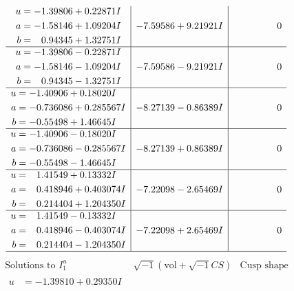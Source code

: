 \documentclass[1p]{elsarticle_modified}
\theoremstyle{definition}
\newcommand{\I}{\sqrt{-1}}
\begin{document}
$$\begin{array}{c|c|c}
\begin{aligned}
u &= -1.39806 + 0.22871 I \\
a &= -1.58146 + 1.09204 I \\
b &= \phantom{-}0.94345 + 1.32751 I\end{aligned}
 & -7.59586 + 9.21921 I & \phantom{-0.000000 } 0 \\ \hline\begin{aligned}
u &= -1.39806 - 0.22871 I \\
a &= -1.58146 - 1.09204 I \\
b &= \phantom{-}0.94345 - 1.32751 I\end{aligned}
 & -7.59586 - 9.21921 I & \phantom{-0.000000 } 0 \\ \hline\begin{aligned}
u &= -1.40906 + 0.18020 I \\
a &= -0.736086 + 0.285567 I \\
b &= -0.55498 + 1.46645 I\end{aligned}
 & -8.27139 - 0.86389 I & \phantom{-0.000000 } 0 \\ \hline\begin{aligned}
u &= -1.40906 - 0.18020 I \\
a &= -0.736086 - 0.285567 I \\
b &= -0.55498 - 1.46645 I\end{aligned}
 & -8.27139 + 0.86389 I & \phantom{-0.000000 } 0 \\ \hline\begin{aligned}
u &= \phantom{-}1.41549 + 0.13332 I \\
a &= \phantom{-}0.418946 + 0.403074 I \\
b &= \phantom{-}0.214404 + 1.204350 I\end{aligned}
 & -7.22098 - 2.65469 I & \phantom{-0.000000 } 0 \\ \hline\begin{aligned}
u &= \phantom{-}1.41549 - 0.13332 I \\
a &= \phantom{-}0.418946 - 0.403074 I \\
b &= \phantom{-}0.214404 - 1.204350 I\end{aligned}
 & -7.22098 + 2.65469 I & \phantom{-0.000000 } 0\\
 \hline 
 \end{array}$$\newpage$$\begin{array}{c|c|c}  
\text{Solutions to }I^u_{1}& \I (\text{vol} + \sqrt{-1}CS) & \text{Cusp shape}\\
 \hline 
\begin{aligned}
u &= -1.39810 + 0.29350 I \\

\end{aligned}
\end{array}$$
\end{document}
